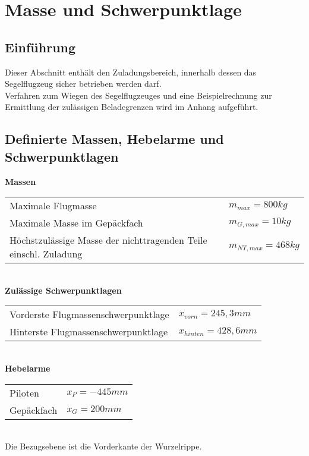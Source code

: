 \chapter{Masse und Schwerpunktlage}
\section{Einführung}
Dieser Abschnitt enthält den Zuladungsbereich, innerhalb dessen das Segelflugzeug sicher betrieben werden darf.\\
Verfahren zum Wiegen des Segelflugzeuges und eine Beispielrechnung zur Ermittlung der zulässigen Beladegrenzen wird im Anhang aufgeführt.
\section{Definierte Massen, Hebelarme und Schwerpunktlagen}
\textbf{Massen}\\
\begin{tabular}{m{} m{3cm}}

Maximale Flugmasse & $m_{max}=800kg$\\
Maximale Masse im Gepäckfach & $m_{G,max}=10kg$\\
Höchstzulässige Masse der nichttragenden Teile einschl. Zuladung & $m_{NT,max}=468kg$\\

\end{tabular}\\
\newline
\newline
\textbf{Zulässige Schwerpunktlagen}\\
\begin{tabular}{m{} m{4cm}}
Vorderste Flugmassenschwerpunktlage & $x_{vorn}=245,3mm$\\
Hinterste Flugmassenschwerpunktlage & $x_{hinten}=428,6mm$\\

\end{tabular}\\
\newline
\newline
\textbf{Hebelarme}\\
\begin{tabular}{m{} m{3cm}}
Piloten & $x_P=-445mm$\\
Gepäckfach & $x_G=200mm$\\

\end{tabular}\\
\newline
Die Bezugsebene ist die Vorderkante der Wurzelrippe.

